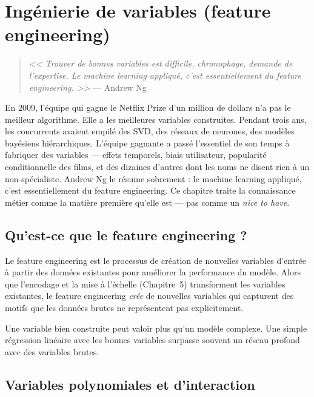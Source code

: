 \chapter{Ing\'enierie de variables (feature engineering)}
\label{ch:feature-engineering}

\begin{quote}
\emph{<< Trouver de bonnes variables est difficile, chronophage, demande de l'expertise. Le machine learning appliqu\'e, c'est essentiellement du feature engineering. >>}
--- Andrew Ng
\end{quote}

En 2009, l'équipe qui gagne le Netflix Prize d'un million de dollars n'a pas le meilleur algorithme. Elle a les meilleures variables construites. Pendant trois ans, les concurrents avaient empilé des SVD, des réseaux de neurones, des modèles bayésiens hiérarchiques. L'équipe gagnante a passé l'essentiel de son temps à fabriquer des variables --- effets temporels, biais utilisateur, popularité conditionnelle des films, et des dizaines d'autres dont les noms ne disent rien à un non-spécialiste. Andrew Ng le résume sobrement : le machine learning appliqué, c'est essentiellement du feature engineering. Ce chapitre traite la connaissance métier comme la matière première qu'elle est --- pas comme un \emph{nice to have}.
\section{Qu'est-ce que le feature engineering ?}

Le feature engineering est le processus de cr\'eation de nouvelles variables d'entr\'ee \`a partir des donn\'ees existantes pour am\'eliorer la performance du mod\`ele. Alors que l'encodage et la mise \`a l'\'echelle (Chapitre~5) transforment les variables existantes, le feature engineering \emph{cr\'ee} de nouvelles variables qui capturent des motifs que les donn\'ees brutes ne repr\'esentent pas explicitement.

\begin{datatip}
Une variable bien construite peut valoir plus qu'un mod\`ele complexe. Une simple r\'egression lin\'eaire avec les bonnes variables surpasse souvent un r\'eseau profond avec des variables brutes.
\end{datatip}

\section{Variables polynomiales et d'interaction}

